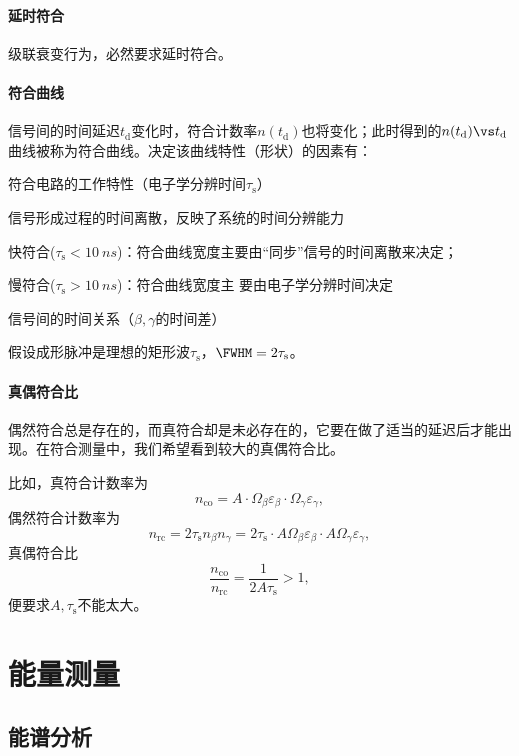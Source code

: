 \paragraph{延时符合}
级联衰变行为，必然要求延时符合。
\paragraph{符合曲线}
信号间的时间延迟$t_\mathrm d$变化时，符合计数率$n(t_\mathrm d)$也将变化；此时得到的$n(t_\mathrm d)\vs t_\mathrm d$曲线被称为符合曲线。决定该曲线特性（形状）的因素有：
\begin{compactitem}
	\item 符合电路的工作特性（电子学分辨时间$\tau_\mathrm s$）
	\item 信号形成过程的时间离散，反映了系统的时间分辨能力
	\begin{compactitem}
		\item 快符合($\tau_\mathrm s<\SI{10}{ns}$)：符合曲线宽度主要由“同步”信号的时间离散来决定；
		\item 慢符合($\tau_\mathrm s>\SI{10}{ns}$)：符合曲线宽度主
		要由电子学分辨时间决定
	\end{compactitem}
	\item 信号间的时间关系（$\beta,\gamma$的时间差）
\end{compactitem}
假设成形脉冲是理想的矩形波$\tau_\mathrm s$，$\FWHM=2\tau_\mathrm s$。
\paragraph{真偶符合比}
偶然符合总是存在的，而真符合却是未必存在的，它要在做了适当的延迟后才能出现。在符合测量中，我们希望看到较大的真偶符合比。

比如，真符合计数率为
\[
	n_{\mathrm{co}}=A\cdot\Omega_\beta\varepsilon_\beta\cdot\Omega_\gamma\varepsilon_\gamma,
\]
偶然符合计数率为
\[
	n_{\mathrm{rc}}=2\tau_\mathrm s n_\beta n_\gamma=2\tau_\mathrm s\cdot A\Omega_\beta\varepsilon_\beta\cdot A\Omega_\gamma\varepsilon_\gamma,
\]
真偶符合比
\[
	\frac{n_{\mathrm{co}}}{n_{\mathrm{rc}}}=\frac1{2A\tau_\mathrm s}>1,
\]
便要求$A,\tau_\mathrm s$不能太大。

\section{能量测量}

\subsection{\textgamma 能谱分析}


